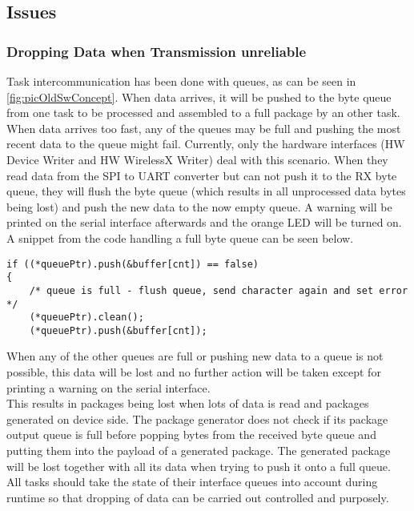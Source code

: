 \subsection{Issues}
%
\subsubsection{Dropping Data when Transmission unreliable}
Task intercommunication has been done with queues, as can be seen in \autoref{fig:picOldSwConcept}. When data arrives, it will be pushed to the byte queue from one task to be processed and assembled to a full package by an other task. \\
When data arrives too fast, any of the queues may be full and pushing the most recent data to the queue might fail. Currently, only the hardware interfaces (HW Device Writer and HW WirelessX Writer) deal with this scenario. When they read data from the SPI to UART converter but can not push it to the RX byte queue, they will flush the byte queue (which results in all unprocessed data bytes being lost) and push the new data to the now empty queue. A warning will be printed on the serial interface afterwards and the orange LED will be turned on. \\
A snippet from the code handling a full byte queue can be seen below.\\
\begin{lstlisting}
if ((*queuePtr).push(&buffer[cnt]) == false)
{
    /* queue is full - flush queue, send character again and set error */
    (*queuePtr).clean();
    (*queuePtr).push(&buffer[cnt]);
\end{lstlisting}
When any of the other queues are full or pushing new data to a queue is not possible, this data will be lost and no further action will be taken except for printing a warning on the serial interface.\\
This results in packages being lost when lots of data is read and packages generated on device side. The package generator does not check if its package output queue is full before popping bytes from the received byte queue and putting them into the payload of a generated package. The generated package will be lost together with all its data when trying to push it onto a full queue. \\
All tasks should take the state of their interface queues into account during runtime so that dropping of data can be carried out controlled and purposely.\\
%
